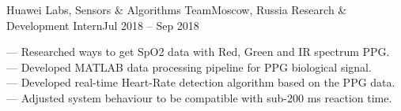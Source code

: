     \resumeSubheading
      {Huawei Labs, Sensors \& Algorithms Team}{Moscow, Russia}
      {Research \& Development Intern}{Jul 2018 -- Sep 2018}
      \begin{itemize}[leftmargin=0in, label={}]
            \small{\item{
                {— Researched ways to get SpO2 data with Red, Green and IR spectrum PPG.}\\
                {— Developed MATLAB data processing pipeline for PPG biological signal.}\\
                {— Developed real-time Heart-Rate detection algorithm based on the PPG data.}\\
                {— Adjusted system behaviour to be compatible with sub-200 ms reaction time. }\\
            }}
      \end{itemize}